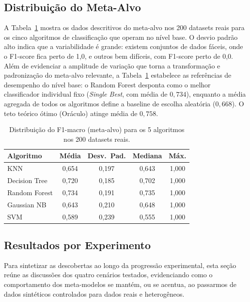 \documentclass[12pt]{article}
\begin{document}
\subsection{Distribuição do Meta-Alvo}

A Tabela~\ref{tab:base_perf} mostra os dados descritivos do meta-alvo nos 200 datasets reais para os cinco algoritmos de classificação que operam no nível base. O desvio padrão alto indica que a variabilidade é grande: existem conjuntos de dados fáceis, onde o F1-score fica perto de 1,0, e outros bem difíceis, com F1-score perto de 0,0. Além de evidenciar a amplitude de variação que torna a transformação e padronização do meta-alvo relevante, a Tabela~\ref{tab:base_perf} estabelece as referências de desempenho do nível base: o Random Forest desponta como o melhor classificador individual fixo (\textit{Single Best}, com média de $0{,}734$), enquanto a média agregada de todos os algoritmos define a baseline de escolha aleatória ($0{,}668$). O teto teórico ótimo (Oráculo) atinge média de $0{,}758$.

\begin{table}[H]
\centering
\caption{Distribuição do F1-macro (meta-alvo) para os 5 algoritmos nos 200 datasets reais.}
\label{tab:base_perf}
\small
\begin{tabular}{lcccc}
\toprule
\textbf{Algoritmo} & \textbf{Média} & \textbf{Desv.\ Pad.} & \textbf{Mediana} & \textbf{Máx.} \\
\midrule
KNN           & 0,654 & 0,197 & 0,643 & 1,000 \\
Decision Tree & 0,720 & 0,185 & 0,702 & 1,000 \\
Random Forest & 0,734 & 0,191 & 0,735 & 1,000 \\
Gaussian NB   & 0,643 & 0,210 & 0,648 & 1,000 \\
SVM           & 0,589 & 0,239 & 0,555 & 1,000 \\
\bottomrule
\end{tabular}
\end{table}

\subsection{Resultados por Experimento}

Para sintetizar as descobertas ao longo da progressão experimental, esta seção reúne as discussões dos quatro cenários testados, evidenciando como o comportamento dos meta-modelos se mantém, ou se acentua, ao passarmos de dados sintéticos controlados para dados reais e heterogêneos.
\end{document}
